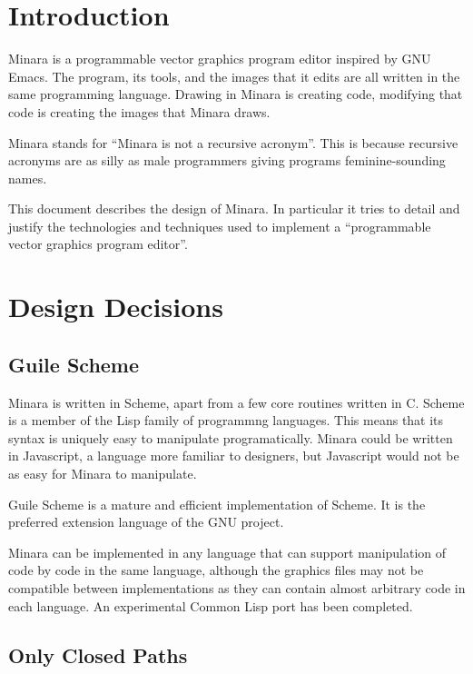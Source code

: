 

\section{Introduction}

Minara is a programmable vector graphics program editor inspired by GNU Emacs. The program, its tools, and the images that it edits are all written in the same programming language. Drawing in Minara is creating code, modifying that code is creating the images that Minara draws. 

Minara stands for ``Minara is not a recursive acronym''. This is because recursive acronyms are as silly as male programmers giving programs feminine-sounding names.

This document describes the design of Minara. In particular it tries to detail and justify the technologies and techniques used to implement a ``programmable vector graphics program editor''.

\section{Design Decisions}

\subsection{Guile Scheme}

Minara is written in Scheme, apart from a few core routines written in C. Scheme is a member of the Lisp family of programmng languages. This means that its syntax is uniquely easy to manipulate programatically. Minara could be written in Javascript, a language more familiar to designers, but Javascript would not be as easy for Minara to manipulate.

Guile Scheme is a mature and efficient implementation of Scheme. It is the preferred extension language of the GNU project.

Minara can be implemented in any language that can support manipulation of code by code in the same language, although the graphics files may not be compatible between implementations as they can contain almost arbitrary code in each language. An experimental Common Lisp port has been completed.

\subsection{Only Closed Paths}

